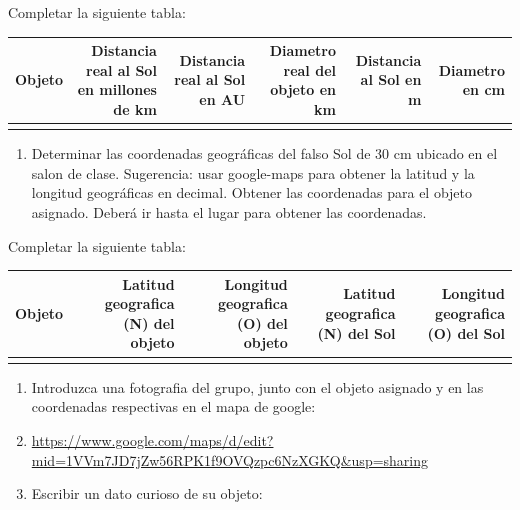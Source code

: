 \documentclass[12pt]{article}
\begin{document}
Completar la siguiente tabla:

\begin{table}[htbp]
    \centering
      \begin{tabular}{|r|r|r|r|r|r|}
      \toprule
      \multicolumn{1}{|p{3.07em}|}{Objeto} & \multicolumn{1}{p{8.785em}|}{Distancia real al Sol en millones de km} & \multicolumn{1}{p{7.285em}|}{Distancia real al Sol en AU} & \multicolumn{1}{p{7.715em}|}{Diametro real del objeto en km} & \multicolumn{1}{p{5.355em}|}{Distancia al Sol en m} & \multicolumn{1}{p{3.93em}|}{Diametro en cm} \\
      \midrule
         &    &    &    &    &  \\
      \bottomrule
      \end{tabular}%
    \label{tab:addlabel}%
\end{table}%
  

\begin{enumerate}
    \item Determinar las coordenadas geográficas del falso Sol de 30 cm ubicado en el salon de clase. Sugerencia: usar google-maps para obtener la latitud y la longitud geográficas en decimal. Obtener las coordenadas para el objeto asignado. Deberá ir hasta el lugar para obtener las coordenadas.
\end{enumerate}

Completar la siguiente tabla:
\begin{table}[htbp]
    \centering
      \begin{tabular}{|r|r|r|r|r|}
      \toprule
      \multicolumn{1}{|p{4.215em}|}{Objeto} & \multicolumn{1}{p{5.07em}|}{Latitud geografica (N) del objeto} & \multicolumn{1}{p{5em}|}{Longitud geografica (O) del objeto} & \multicolumn{1}{p{4.785em}|}{Latitud geografica (N) del Sol} & \multicolumn{1}{p{5em}|}{Longitud geografica (O) del Sol} \\
      \midrule
         &    &    &    &  \\
      \bottomrule
      \end{tabular}%
    \label{tab:addlabel}%
\end{table}%

\begin{enumerate}
    \item Introduzca una fotografia del grupo, junto con el objeto asignado y en las coordenadas respectivas en el mapa de google:
    \item \url{https://www.google.com/maps/d/edit?mid=1VVm7JD7jZw56RPK1f9OVQzpc6NzXGKQ&usp=sharing}
    \item Escribir un dato curioso de su objeto:
\end{enumerate}
\end{document}
